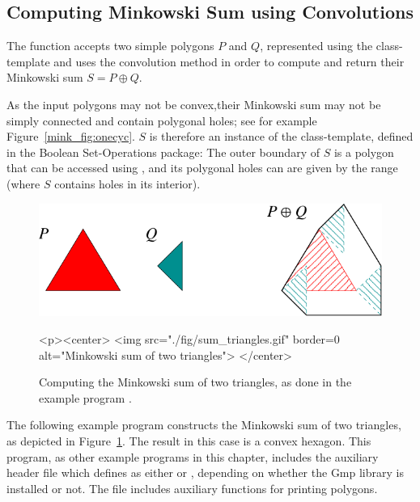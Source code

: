 \subsection{Computing Minkowski Sum using Convolutions}
\label{mink_ssec:sum_conv}

The function  accepts two simple polygons $P$
and $Q$, represented using the 
class-template and uses the convolution method in order to compute and
return their Minkowski sum $S = P \oplus Q$.

As the input polygons may not be convex,their Minkowski sum may not be
simply connected and contain polygonal holes; see for example
Figure~\ref{mink_fig:onecyc}. $S$ is therefore an instance of the
 class-template, defined in the
Boolean Set-Operations package: The outer boundary of $S$ is a polygon that
can be accessed using , and its polygonal holes can
are given by the range \ccc{[S.holes_begin(), S.holes_end())} (where $S$
contains  holes in its interior).

\begin{figure}[t]
\begin{ccTexOnly}
  \begin{center}
    \includegraphics{Minkowski_sum_2/fig/sum_triangles}
  \end{center}
\end{ccTexOnly}
\begin{ccHtmlOnly}
  <p><center>
  <img src="./fig/sum_triangles.gif" border=0 alt="Minkowski sum of two triangles">
  </center>
\end{ccHtmlOnly}
\caption{Computing the Minkowski sum of two triangles, as done
in the example program .}
\label{mink_fig:sum_tri}
\end{figure}

The following example program constructs the Minkowski sum of two triangles,
as depicted in Figure~\ref{mink_fig:sum_tri}. The result in this case is
a convex hexagon. This program, as other example programs in this chapter,
includes the auxiliary header file  which defines
 as either  or ,
depending on whether the {\sc Gmp} library is installed or not.
The file  includes auxiliary functions for printing polygons.


